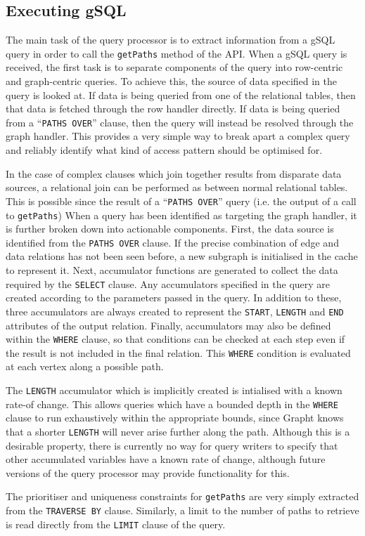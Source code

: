 \subsection{Executing gSQL}

The main task of the query processor is to extract information from a gSQL
query in order to call the \texttt{getPaths} method of the API. When a gSQL
query is received, the first task is to separate components of the query into
row-centric and graph-centric queries. To achieve this, the source of data
specified in the query is looked at. If data is being queried from one of the
relational tables, then that data is fetched through the row handler directly.
If data is being queried from a ``\texttt{PATHS OVER}'' clause, then the query
will instead be resolved through the graph handler. This provides a very
simple way to break apart a complex query and reliably identify what kind of
access pattern should be optimised for.

In the case of complex clauses which  join together results from disparate
data sources, a relational join can be performed as between normal relational
tables. This is possible since the result of a ``\texttt{PATHS OVER}'' query
(i.e. the output of a call to \texttt{getPaths}) When a query has been
identified as targeting the graph handler, it is further broken down into
actionable components. First, the data source is identified from the
\texttt{PATHS OVER} clause. If the precise combination of edge and data
relations has not been seen before, a new subgraph is initialised in the cache
to represent it. Next, accumulator functions are generated to collect the data
required by the \texttt{SELECT} clause. Any accumulators specified in the
query are created according to the parameters passed in the query. In addition
to these, three accumulators are always created to represent the
\texttt{START}, \texttt{LENGTH} and \texttt{END} attributes of the output
relation. Finally, accumulators may also be  defined within the \texttt{WHERE}
clause, so that conditions can be checked at each step even if the result is
not included in the final relation. This \texttt{WHERE} condition is evaluated
at each vertex along a possible path.

The \texttt{LENGTH} accumulator which is implicitly created is intialised with
a known rate-of change. This allows queries which have a bounded depth in the
\texttt{WHERE} clause to run exhaustively within the appropriate bounds, since
Grapht knows that a shorter \texttt{LENGTH} will never arise further along the
path. Although this is a desirable property, there is currently no way for
query writers to specify that other accumulated variables have a known rate of
change, although future versions of the query processor may provide
functionality for this.

The prioritiser and uniqueness constraints for \texttt{getPaths} are very
simply extracted from the \texttt{TRAVERSE BY} clause. Similarly, a limit  to
the number of paths to retrieve is read directly from the \texttt{LIMIT}
clause of the query.




